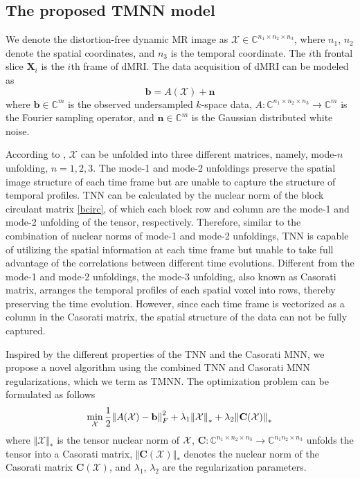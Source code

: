 \documentclass{article}
\begin{document}
\subsection{The proposed TMNN model}
\label{subsec:model}

We denote the  distortion-free dynamic MR image as $\mathcal{X} \in \mathbb{C}^{n_{1} \times n_{2} \times n_{3}}$, where $n_1$, $n_2$ denote the spatial coordinates, and $n_3$ is the temporal coordinate. The $i$th frontal slice $\mathbf X_i$ is the $i$th frame of dMRI. The data acquisition of dMRI can be modeled as
\begin{equation}
  \mathbf b = A(\mathcal{X}) +\mathbf{n}
\end{equation}
where $\mathbf b \in \mathbb{C}^{m}$ is the observed undersampled $k$-space data, $A: \mathbb{C}^{n_{1} \times n_{2} \times n_{3}} \rightarrow \mathbb{C}^m$ is the Fourier sampling operator, and $\mathbf{n} \in \mathbb{C}^{m}$ is the Gaussian distributed white noise.

According to \cite{ref_tensor}, $\mathcal{X}$ can be unfolded into three different matrices, namely, mode-$n$ unfolding, $n=1,2,3$. The mode-1 and mode-2 unfoldings preserve the spatial image structure of each time frame but are unable to capture the structure of temporal profiles. TNN can be calculated by the nuclear norm of the block circulant matrix \eqref{bcirc}, of which each block row and column are the mode-1 and mode-2 unfolding of the tensor, respectively. Therefore, similar to the combination of nuclear norms of mode-1 and mode-2 unfoldings, TNN is capable of utilizing the spatial information at each time frame but unable to take full advantage of the correlations between different time evolutions. Different from the mode-1 and mode-2 unfoldings, the mode-3 unfolding, also known as Casorati matrix, arranges the temporal profiles of each spatial voxel into rows, thereby preserving the time evolution. However, since each time frame is vectorized as a column in the Casorati matrix, the spatial structure of the data can not be fully captured. 

Inspired by the different properties of the TNN and the Casorati MNN, we propose a novel algorithm using the combined TNN and Casorati MNN regularizations, which we term as TMNN. The optimization problem can be formulated as follows
\begin{equation}
  \small
\label{model}
\min_{\mathcal{X}} \frac12 {\Vert A(\mathcal{X})-\mathbf b \Vert}_F^2+\lambda_1{\Vert \mathcal{X} \Vert}_*+\lambda_2{\Vert \mathbf C (\mathcal{X}) \Vert}_*
\end{equation}
where ${\Vert \mathcal{X} \Vert}_*$ is the tensor nuclear norm of ${\cal X}$, $\mathbf C: \mathbb{C}^{n_{1} \times n_{2} \times n_{3}} \rightarrow \mathbb{C}^{n_{1} n_{2} \times n_{3}}$ unfolds the tensor into a Casorati matrix, ${\Vert \mathbf C (\mathcal{X}) \Vert}_*$ denotes the nuclear norm of the Casorati matrix $\mathbf C(\mathcal{X})$, and $\lambda_1$, $\lambda_2$ are the regularization parameters.
\end{document}
